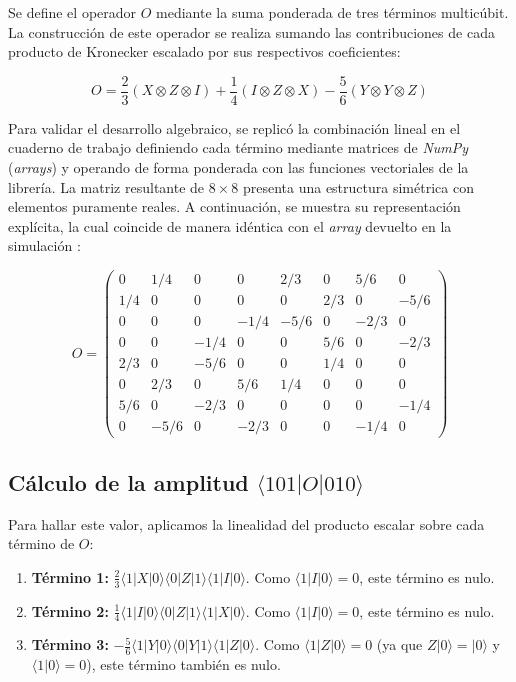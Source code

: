 \documentclass[11pt,a4paper,spanish]{book}
\begin{document}
Se define el operador $O$ mediante la suma ponderada de tres términos multicúbit. La construcción de este operador se realiza sumando las contribuciones de cada producto de Kronecker escalado por sus respectivos coeficientes:

\[ O = \frac{2}{3}(X \otimes Z \otimes I) + \frac{1}{4}(I \otimes Z \otimes X) - \frac{5}{6}(Y \otimes Y \otimes Z) \]

Para validar el desarrollo algebraico, se replicó la combinación lineal en el cuaderno de trabajo definiendo cada término mediante matrices de \textit{NumPy} (\textit{arrays}) y operando de forma ponderada con las funciones vectoriales de la librería. La matriz resultante de $8 \times 8$ presenta una estructura simétrica con elementos puramente reales. A continuación, se muestra su representación explícita, la cual coincide de manera idéntica con el \textit{array} devuelto en la simulación \citep{numpy2020}:

\[
O = \left(
\begin{array}{cccccccc}
0 & 1/4 & 0 & 0 & 2/3 & 0 & 5/6 & 0 \\
1/4 & 0 & 0 & 0 & 0 & 2/3 & 0 & -5/6 \\
0 & 0 & 0 & -1/4 & -5/6 & 0 & -2/3 & 0 \\
0 & 0 & -1/4 & 0 & 0 & 5/6 & 0 & -2/3 \\
2/3 & 0 & -5/6 & 0 & 0 & 1/4 & 0 & 0 \\
0 & 2/3 & 0 & 5/6 & 1/4 & 0 & 0 & 0 \\
5/6 & 0 & -2/3 & 0 & 0 & 0 & 0 & -1/4 \\
0 & -5/6 & 0 & -2/3 & 0 & 0 & -1/4 & 0 
\end{array} \right)
\]

\subsection{Cálculo de la amplitud $\langle 101 | O | 010 \rangle$}
Para hallar este valor, aplicamos la linealidad del producto escalar sobre cada término de $O$:

\begin{enumerate}
    \item \textbf{Término 1:} $\frac{2}{3} \langle 1|X|0\rangle \langle 0|Z|1\rangle \langle 1|I|0\rangle$. Como $\langle 1|I|0\rangle = 0$, este término es nulo.
    \item \textbf{Término 2:} $\frac{1}{4} \langle 1|I|0\rangle \langle 0|Z|1\rangle \langle 1|X|0\rangle$. Como $\langle 1|I|0\rangle = 0$, este término es nulo.
    \item \textbf{Término 3:} $-\frac{5}{6} \langle 1|Y|0\rangle \langle 0|Y|1\rangle \langle 1|Z|0\rangle$. Como $\langle 1|Z|0\rangle = 0$ (ya que $Z|0\rangle = |0\rangle$ y $\langle 1|0\rangle = 0$), este término también es nulo.
\end{enumerate}
\end{document}
